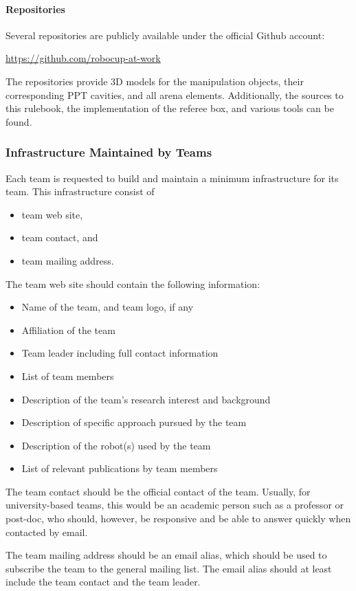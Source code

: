 \paragraph{Repositories}
Several repositories are publicly available under the official \RCAW Github account:
\begin{center}
\url{https://github.com/robocup-at-work}
\end{center}

The repositories provide 3D models for the manipulation objects, their corresponding PPT cavities, and all arena elements. Additionally, the sources to this rulebook, the implementation of the referee box, and various tools can be found.


\subsubsection{Infrastructure Maintained by Teams}
Each team is requested to build and maintain a minimum infrastructure for its team. This infrastructure consist of

\begin{itemize}
	\item team web site,
	\item team contact, and
	\item team mailing address.
\end{itemize}

The team web site should contain the following information:

\begin{itemize}
	\item Name of the team, and team logo, if any
	\item Affiliation of the team
	\item Team leader including full contact information
	\item List of team members
	\item Description of the team's research interest and background
	\item Description of specific approach pursued by the team
	\item Description of the robot(s) used by the team
	\item List of relevant publications by team members

\end{itemize}

The team contact should be the official contact of the team. Usually, for university-based teams, this would be an academic person such as a professor or post-doc, who should, however, be responsive and be able to answer quickly when contacted by email.
\par
The team mailing address should be an email alias, which should be used to subscribe the team to the general \RCAW mailing list. The email alias should at least include the team contact and the team leader.

